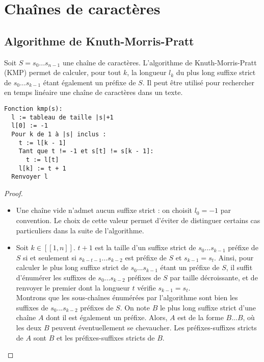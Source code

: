 \documentclass[11pt,a4paper]{article}
\begin{document}
\section{Chaînes de caractères}


  \subsection{Algorithme de Knuth-Morris-Pratt}

Soit \(S = s_0...s_{n-1}\) une chaîne de caractères. L'algorithme de Knuth-Morris-Pratt (KMP) permet de calculer, pour tout \(k\), la longueur \(l_k\) du plus long suffixe strict de \(s_0...s_{k-1}\) étant également un préfixe de \(S\). Il peut être utilisé pour rechercher en temps linéaire une chaîne de caractères dans un texte.

\begin{lstlisting}
Fonction kmp(s):
  l := tableau de taille |s|+1
  l[0] := -1
  Pour k de 1 à |s| inclus :
    t := l[k - 1]
    Tant que t != -1 et s[t] != s[k - 1]:
      t := l[t]
    l[k] := t + 1
  Renvoyer l
\end{lstlisting}

\begin{proof}\leavevmode
\begin{itemize}
  \item Une chaîne vide n'admet aucun suffixe strict : on choisit \(l_0 = -1\) par convention. Le choix de cette valeur permet d'éviter de distinguer certains cas particuliers dans la suite de l'algorithme.
  \item Soit \(k \in [\![1, n]\!]\). \(t+1\) est la taille d'un suffixe strict de \(s_0...s_{k-1}\) préfixe de \(S\) si et seulement si \(s_{k-t-1}...s_{k-2}\) est préfixe de \(S\) et \(s_{k-1}=s_t\). Ainsi, pour calculer le plus long suffixe strict de \(s_0...s_{k-1}\) étant un préfixe de \(S\), il suffit d'énumérer les suffixes de \(s_0...s_{k-2}\) préfixes de \(S\) par taille décroissante, et de renvoyer le premier dont la longueur \(t\) vérifie \(s_{k-1}=s_t\). \\
  Montrons que les sous-chaînes énumérées par l'algorithme sont bien les suffixes de \(s_0...s_{k-2}\) préfixes de \(S\). On note \(B\) le plus long suffixe strict d'une chaîne \(A\) dont il est également un préfixe. Alors, \(A\) est de la forme \(B ... B\), où les deux \(B\) peuvent éventuellement se chevaucher. Les préfixes-suffixes stricts de \(A\) sont \(B\) et les préfixes-suffixes stricts de \(B\).
\end{itemize}
\end{proof}
\end{document}
